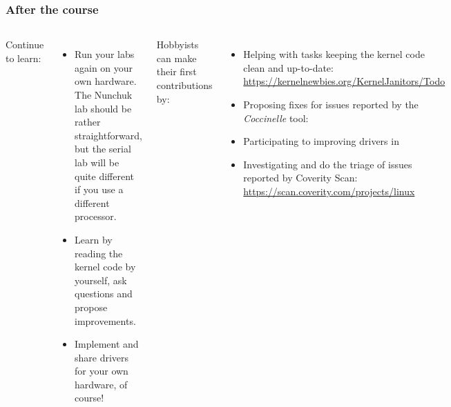 \begin{frame}
  \frametitle{After the course}
  \begin{columns}
  Continue to learn:
  \begin{itemize}
  \item Run your labs again on your own hardware. The Nunchuk lab should
        be rather straightforward, but the serial lab will be quite different
	if you use a different processor.
  \item Learn by reading the kernel code by yourself, ask questions and
	propose improvements.
  \item Implement and share drivers for your own hardware, of course!
  \end{itemize}
  Hobbyists can make their first contributions by:
  \begin{itemize}
  \item Helping with tasks keeping the kernel code clean and up-to-date:\\
	\url{https://kernelnewbies.org/KernelJanitors/Todo}
  \item Proposing fixes for issues reported by the {\em Coccinelle} tool:\\
  \item Participating to improving drivers in 
  \item Investigating and do the triage of issues reported by Coverity Scan:
        \url{https://scan.coverity.com/projects/linux}
  \end{itemize}
  \end{columns}
\end{frame}

